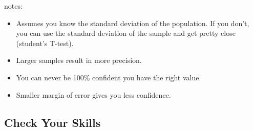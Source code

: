\documentclass[landscape]{exam}
\begin{document}
  notes:
  \begin{itemize}
    \item Assumes you know the standard deviation of the population. If you
      don't, you can use the standard deviation of the sample and get pretty
      close (student's T-test).

    \item Larger samples result in more precision.

    \item You can never be 100\% confident you have the right value.

    \item Smaller margin of error gives you less confidence.
  \end{itemize}

  \subsection{Check Your Skills}
\end{document}
